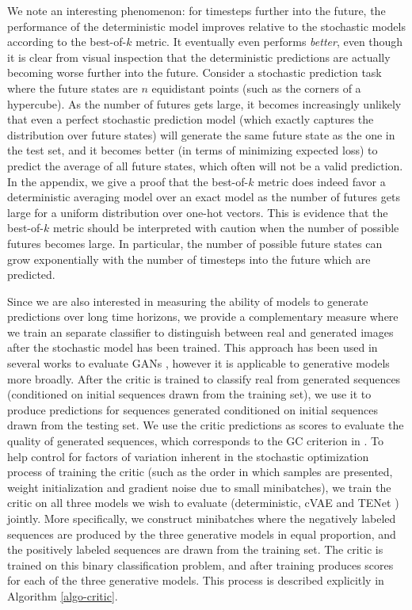 \documentclass{article}
\newcommand{\modelname}{TENet }
\begin{document}
We note an interesting phenomenon: for timesteps further into the future, the performance of the deterministic model improves relative to the stochastic models according to the best-of-$k$ metric. It eventually even performs \textit{better}, even though it is clear from visual inspection that the deterministic predictions are actually becoming worse further into the future.
Consider a stochastic prediction task where the future states are $n$ equidistant points (such as the corners of a hypercube).
As the number of futures gets large, it becomes increasingly unlikely that even a perfect stochastic prediction model (which exactly captures the distribution over future states) will generate the same future state as the one in the test set, and it becomes better (in terms of minimizing expected loss) to predict the average of all future states, which often will not be a valid prediction.
In the appendix, we give a proof that the best-of-$k$ metric does indeed favor a deterministic averaging model over an exact model as the number of futures gets large for a uniform distribution over one-hot vectors.
This is evidence that the best-of-$k$ metric should be interpreted with caution when the number of possible futures becomes large.
In particular, the number of possible future states can grow exponentially with the number of timesteps into the future which are predicted.


Since we are also interested in measuring the ability of models to generate predictions over long time horizons, we provide a complementary measure where we train an separate classifier to distinguish between real and generated images after the stochastic model has been trained.
This approach has been used in several works to evaluate GANs \citep{Danihelka17, Rosca17, GANeval}, however it is applicable to generative models more broadly.
After the critic is trained to classify real from generated sequences (conditioned on initial sequences drawn from the training set), we use it to produce predictions for sequences generated conditioned on initial sequences drawn from the testing set.
We use the critic predictions as scores to evaluate the quality of generated sequences, which corresponds to the GC criterion in \citep{GANeval}.
To help control for factors of variation inherent in the stochastic optimization process of training the critic (such as the order in which samples are presented, weight initialization and gradient noise due to small minibatches), we train the critic on all three models we wish to evaluate (deterministic, cVAE and \modelname) jointly.
More specifically, we construct minibatches where the negatively labeled sequences are produced by the three generative models in equal proportion, and the positively labeled sequences are drawn from the training set.
The critic is trained on this binary classification problem, and after training produces scores for each of the three generative models.
This process is described explicitly in Algorithm \ref{algo-critic}.
\end{document}
